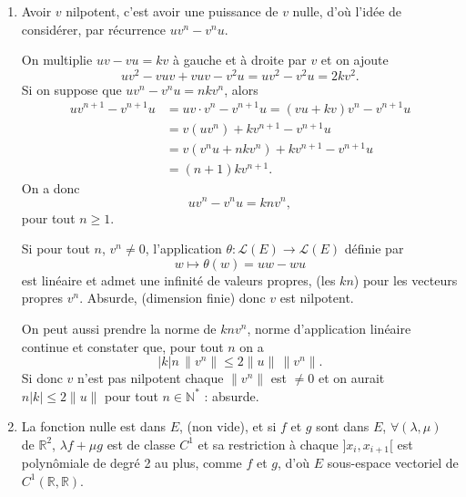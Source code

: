 \begin{enumerate}[label=\arabic*.,leftmargin=2.2em,itemsep=1.1em]
Il existe alors $b$ réel tel que les réels $\lambda_k+\mu_kb$ soient 2 à 2 distincts, car les conditions du type
\[
\lambda_k+b\mu_k=\lambda_j+b\mu_j
\]
sont en nombre fini, elles s'écrivent $b(\mu_k-\mu_j)=\lambda_j-\lambda_k$ et si $\mu_j\ne\mu_k$ : on a une seule solution en $b$, alors que si $\mu_j=\mu_k$, les couples étant distincts on a $\lambda_j\ne\lambda_k$ et aucune solution en $b$. Finalement sauf pour un nombre fini de réels $b$, on a $\lambda_k+\mu_kb\ne\lambda_j+\mu_jb$, pour tout $j\ne k$.

Avec un tel choix de $b$,
\[
\sum_{k=1}^n\alpha_k f_{\lambda_k,\mu_k}(x,bx)=0
\]
conduit à
\[
\sum_{k=1}^n\alpha_ke^{(\lambda_k+b\mu_k)x}=0,
\]
avec des $\lambda_k+b\mu_k$ 2 à 2 distincts d'où les $\alpha_k$ nuls.

\item Avoir $v$ nilpotent, c'est avoir une puissance de $v$ nulle, d'où l'idée de considérer, par récurrence $uv^n-v^nu$.

On multiplie $uv-vu=kv$ à gauche et à droite par $v$ et on ajoute
\[
uv^2-vuv+vuv-v^2u=uv^2-v^2u=2kv^2.
\]
Si on suppose que $uv^n-v^nu=nkv^n$, alors
\[
\begin{aligned}
uv^{n+1}-v^{n+1}u
&=uv\cdot v^n-v^{n+1}u=(vu+kv)v^n-v^{n+1}u\\
&=v(uv^n)+kv^{n+1}-v^{n+1}u\\
&=v(v^nu+nkv^n)+kv^{n+1}-v^{n+1}u\\
&=(n+1)kv^{n+1}.
\end{aligned}
\]
On a donc
\[
uv^n-v^nu=knv^n,
\]
pour tout $n\ge1$.

Si pour tout $n$, $v^n\ne0$, l'application $\theta:\mathcal L(E)\to\mathcal L(E)$ définie par
\[
w\longmapsto\theta(w)=uw-wu
\]
est linéaire et admet une infinité de valeurs propres, (les $kn$) pour les vecteurs propres $v^n$. Absurde, (dimension finie) donc $v$ est nilpotent.

On peut aussi prendre la norme de $knv^n$, norme d'application linéaire continue et constater que, pour tout $n$ on a
\[
|k|n\,\lVert v^n\rVert\le2\lVert u\rVert\,\lVert v^n\rVert.
\]
Si donc $v$ n'est pas nilpotent chaque $\lVert v^n\rVert$ est $\ne0$ et on aurait $n|k|\le2\lVert u\rVert$ pour tout $n\in\mathbb N^*$ : absurde.

\item La fonction nulle est dans $E$, (non vide), et si $f$ et $g$ sont dans $E$, $\forall(\lambda,\mu)$ de $\mathbb R^2$, $\lambda f+\mu g$ est de classe $C^1$ et sa restriction à chaque $]x_i,x_{i+1}[$ est polynômiale de degré 2 au plus, comme $f$ et $g$, d'où $E$ sous-espace vectoriel de $C^1(\mathbb R,\mathbb R)$.


\end{enumerate}
